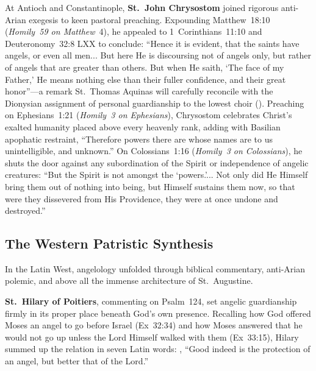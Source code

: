 At Antioch and Constantinople, \textbf{St.~John Chrysostom} joined rigorous anti-Arian exegesis to keen pastoral preaching. Expounding Matthew~18:10 (\emph{Homily~59 on Matthew}~4), he appealed to 1~Corinthians~11:10 and Deuteronomy~32:8 LXX to conclude: ``Hence it is evident, that the saints have angels, or even all men... But here He is discoursing not of angels only, but rather of angels that are greater than others. But when He saith, `The face of my Father,' He means nothing else than their fuller confidence, and their great honor''---a remark St.~Thomas Aquinas will carefully reconcile with the Dionysian assignment of personal guardianship to the lowest choir (). Preaching on Ephesians~1:21 (\emph{Homily~3 on Ephesians}), Chrysostom celebrates Christ's exalted humanity placed above every heavenly rank, adding with Basilian apophatic restraint, ``Therefore powers there are whose names are to us unintelligible, and unknown.'' On Colossians~1:16 (\emph{Homily~3 on Colossians}), he shuts the door against any subordination of the Spirit or independence of angelic creatures: ``But the Spirit is not amongst the `powers.'... Not only did He Himself bring them out of nothing into being, but Himself sustains them now, so that were they dissevered from His Providence, they were at once undone and destroyed.''

\subsection{The Western Patristic Synthesis}
\label{subsec:western-fathers}

In the Latin West, angelology unfolded through biblical commentary, anti-Arian polemic, and above all the immense architecture of St.~Augustine.

\textbf{St.~Hilary of Poitiers}, commenting on Psalm~124, set angelic guardianship firmly in its proper place beneath God's own presence. Recalling how God offered Moses an angel to go before Israel (Ex~32:34) and how Moses answered that he would not go up unless the Lord Himself walked with them (Ex~33:15), Hilary summed up the relation in seven Latin words: , ``Good indeed is the protection of an angel, but better that of the Lord.''


